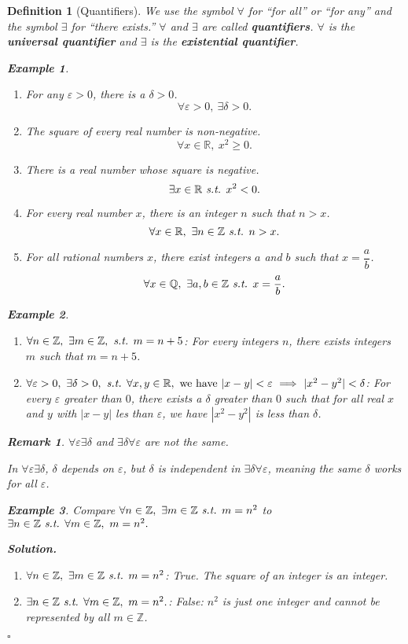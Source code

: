 \documentclass[12pt,a4paper]{article}
\newtheorem{df}{Definition}[subsection]
\newtheorem{eg}{Example}[subsection]
\newenvironment*{sol}{\par\indent\textbf{\textit{Solution. }}}{\hfill{$\square$}\par}
\newtheorem*{rmk}{\indent Remark}
\def\Z{{\mathbb{Z}}}
\def\R{{\mathbb{R}}}
\def\Q{{\mathbb{Q}}}
\def\st{\emph{ s.t. }}
\begin{document}
\begin{df}[Quantifiers]
	We use the symbol $\forall$ for ``for all'' or ``for any'' and the symbol $\exists$ for ``there exists.'' $\forall$ and $\exists$ are called \textbf{quantifiers}. $\forall$ is the \textbf{universal quantifier} and $\exists$ is the \textbf{existential quantifier}.	 
	\begin{eg}
		\begin{enumerate}
			\item For any $\varepsilon>0$, there is a $\delta>0$.\[\forall\varepsilon>0,\ \exists\delta>0.\]
			\item The square of every real number is non-negative. \[\forall x\in\R,\ x^2\geq0.\]
			\item There is a real number whose square is negative. \[\exists x\in\R\st x^2<0.\]
			\item For every real number $x$, there is an integer $n$ such that $n>x$. \[\forall x\in\R,\ \exists n\in\Z\st n>x.\]
			\item For all rational numbers $x$, there exist integers $a$ and $b$ such that $x=\dfrac{a}{b}$. \[\forall x\in\Q,\ \exists a,b\in\Z\st x=\frac{a}{b}.\]
		\end{enumerate}	
	\end{eg}
	\begin{eg}
		\begin{enumerate}
			\item $\forall n\in\Z,\ \exists m\in\Z,\st m=n+5$: For every integers $n$, there exists integers $m$ such that $m=n+5$.
			\item $\forall\varepsilon>0,\ \exists\delta>0,\st\forall x,y\in\R,\text{ we have }|x-y|<\varepsilon\ \Longrightarrow\ |x^2-y^2|<\delta$: For every $\varepsilon$ greater than $0$, there exists a $\delta$ greater than $0$ such that for all real $x$ and $y$ with $|x-y|$ les than $\varepsilon$, we have $|x^2-y^2|$ is less than $\delta$. 
		\end{enumerate}
	\end{eg}
	\begin{rmk}
		$\forall\varepsilon\exists\delta$ and $\exists\delta\forall\varepsilon$ are not the same.
		
		In $\forall\varepsilon\exists\delta$, $\delta$ depends on $\varepsilon$, but $\delta$ is independent in $\exists\delta\forall\varepsilon$, meaning the same $\delta$ works for all $\varepsilon$.
		\begin{eg} 
			Compare $\forall n\in\Z,\ \exists m\in\Z\st m=n^2$ to  $\exists n\in\Z\st\forall m\in\Z,\ m=n^2.$
			\begin{sol}
				\begin{enumerate}
					\item $\forall n\in\Z,\ \exists m\in\Z\st m=n^2$: True. The square of an integer is an integer. 
					\item $\exists n\in\Z\st\forall m\in\Z,\ m=n^2.$: False: $n^2$ is just one integer and cannot be represented by all $m\in\Z$.
				\end{enumerate}
			\end{sol}
		\end{eg}
	\end{rmk}
\end{df}
\end{document}
